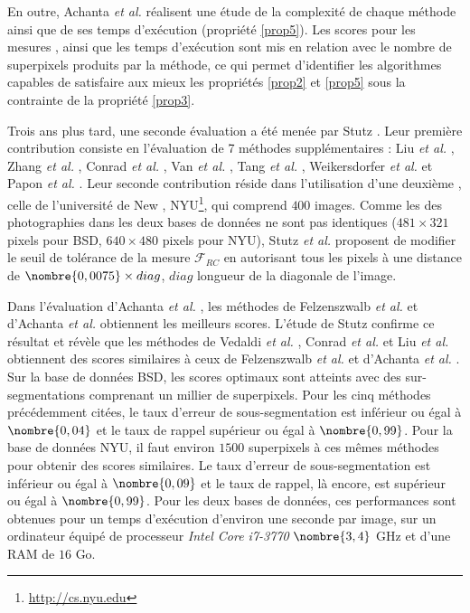 En outre, Achanta \textit{et al.} réalisent une étude de la complexité de chaque méthode ainsi que de ses temps d’exécution (propriété \ref{prop5}). Les scores pour les mesures , ainsi que les temps d'exécution sont mis en relation avec le nombre de superpixels produits par la méthode, ce qui permet d'identifier les algorithmes capables de satisfaire aux mieux les propriétés \ref{prop2} et \ref{prop5} sous la contrainte de la propriété \ref{prop3}. 

Trois ans plus tard, une seconde évaluation a été menée par Stutz .  Leur première contribution consiste en l'évaluation de 7 méthodes supplémentaires : Liu \textit{et al.} \cite{liu2011entropy},  Zhang \textit{et al.} \cite{zhang2011superpixels}, Conrad \textit{et al.} \cite{conrad2013contour}, Van \textit{et al.} \cite{van2012seeds}, Tang \textit{et al.} \cite{tang2012topology}, Weikersdorfer \textit{et al.} \cite{weikersdorfer2012depth} et Papon \textit{et al.} \cite{papon2013voxel}. Leur seconde contribution réside dans l'utilisation d'une deuxième  , celle de l'université de New , NYU\footnote{\url{http://cs.nyu.edu}}, qui comprend $400$ images. Comme les  des photographies dans les deux bases de données ne sont pas identiques ($481 \times 321$ pixels pour BSD, $640 \times 480$ pixels pour NYU), Stutz \textit{et al.} proposent de modifier le seuil de tolérance de la mesure $\mathcal{F}_{RC}$ en autorisant tous les pixels à une distance de $\nombre{0,0075} \times diag$, $diag$  longueur de la diagonale de l'image.  

Dans l'évaluation d'Achanta \textit{et al.} \cite{achanta2012slic}, les méthodes de Felzenszwalb \textit{et al.} \cite{felzenszwalb2004efficient} et d'Achanta \textit{et al.} \cite{achanta2012slic} obtiennent les meilleurs scores. L'étude de Stutz  confirme ce résultat et révèle que les méthodes de Vedaldi \textit{et al.} \cite{vedaldi2008quick}, Conrad \textit{et al.} \cite{conrad2013contour} et  Liu \textit{et al.} \cite{liu2011entropy} obtiennent des scores similaires à ceux de Felzenszwalb \textit{et al.} \cite{felzenszwalb2004efficient} et d'Achanta \textit{et al.} \cite{achanta2012slic}. Sur la base de données BSD, les scores optimaux sont atteints avec des sur-segmentations comprenant un millier de superpixels. Pour les cinq méthodes précédemment citées, le taux d'erreur de sous-segmentation est inférieur ou égal à $\nombre{0,04}$ et le taux de rappel supérieur ou égal à $\nombre{0,99}$. Pour la base de données NYU,  il faut environ $1500$ superpixels à ces mêmes méthodes pour obtenir des scores similaires. Le taux d'erreur de sous-segmentation est inférieur ou égal à $\nombre{0,09}$ et le taux de rappel, là encore, est supérieur ou égal à $\nombre{0,99}$. Pour les deux bases de données, ces performances sont obtenues pour un temps d’exécution d'environ une seconde par image, sur un ordinateur équipé de processeur \emph{Intel Core i7-3770} $\nombre{3,4}$ GHz et d'une RAM de $16$ Go. 

